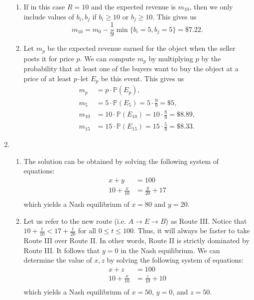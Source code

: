 \documentclass{article}
\newcommand{\prob}[1]{\mathbb{P}\left( #1 \right)}
\begin{document}
\begin{enumerate}
\begin{enumerate}
        \item If in this case $R=10$ and the expected revenue is $m_{10}$, then we only include values of $b_i,b_j$ if $b_i\geq10$ or $b_j\geq10$. This gives us
        $$m_{10}=m_0-\frac{1}{9}\min\{b_i=5,b_j=5\}=\$7.22.$$

        \item Let $m_p$ be the expected revenue earned for the object when the seller posts it for price $p$. We can compute $m_p$ by multiplying $p$ by the probability that at least one of the buyers want to buy the object at a price of at least $p$--let $E_p$ be this event. This gives us
        \begin{align*}
            m_p & =p\cdot\prob{E_p}, \\
            m_5 & =5\cdot\prob{E_5}=5\cdot\frac{9}{9}=\$5, \\
            m_{10} & =10\cdot\prob{E_{10}}=10\cdot\frac{8}{9}=\$8.89, \\
            m_{15} & =15\cdot\prob{E_{15}}=15\cdot\frac{5}{9}=\$8.33.
        \end{align*}
    \end{enumerate}

    \item 
    \begin{enumerate}
        \item The solution can be obtained by solving the following system of equations:
        \begin{align*}
            x+y & =100 \\
            10+\frac{x}{10} & =\frac{y}{20}+17 \\
        \end{align*}
        which yields a Nash equilibrium of $x=80$ and $y=20$.

        \item Let us refer to the new route (i.e. $A\to E\to B$) as Route III. Notice that $10+\frac{t}{10}<17+\frac{t}{20}$ for all $0\leq t\leq100$. Thus, it will always be faster to take Route III over Route II. In other words, Route II is strictly dominated by Route III. It follows that $y=0$ in the Nash equilibrium. We can determine the value of $x,z$ by solving the following system of equations:
        \begin{align*}
            x+z & =100 \\
            10+\frac{x}{10} & =\frac{z}{10}+10 \\
        \end{align*}
        which yields a Nash equilibrium of $x=50$, $y=0$, and $z=50$.
    \end{enumerate}


\end{enumerate}
\end{document}

